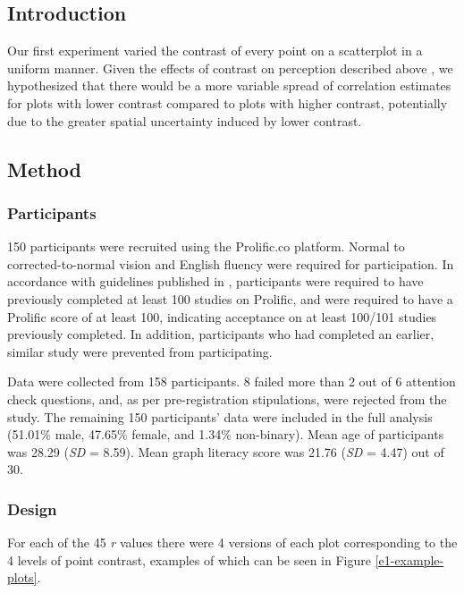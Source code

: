 \documentclass[preprint, 3p,
authoryear]{elsarticle} %
\begin{document}
\hypertarget{introduction-1}{%
\subsection{Introduction}\label{introduction-1}}

Our first experiment varied the contrast of every point on a scatterplot
in a uniform manner. Given the effects of contrast on perception
described above \citep{champion_2017, wehrhahn_1990}, we hypothesized
that there would be a more variable spread of correlation estimates for
plots with lower contrast compared to plots with higher contrast,
potentially due to the greater spatial uncertainty induced by lower
contrast.

\hypertarget{method}{%
\subsection{Method}\label{method}}

\hypertarget{participants}{%
\subsubsection{Participants}\label{participants}}

150 participants were recruited using the Prolific.co platform. Normal
to corrected-to-normal vision and English fluency were required for
participation. In accordance with guidelines published in
\citet{peer_2021}, participants were required to have previously
completed at least 100 studies on Prolific, and were required to have a
Prolific score of at least 100, indicating acceptance on at least
100/101 studies previously completed. In addition, participants who had
completed an earlier, similar study were prevented from participating.

Data were collected from 158 participants. 8 failed more than 2 out of 6
attention check questions, and, as per pre-registration stipulations,
were rejected from the study. The remaining 150 participants' data were
included in the full analysis (51.01\% male, 47.65\% female, and 1.34\%
non-binary). Mean age of participants was 28.29 (\emph{SD} = 8.59). Mean
graph literacy score was 21.76 (\emph{SD} = 4.47) out of 30.

\hypertarget{design}{%
\subsubsection{Design}\label{design}}

For each of the 45 \emph{r} values there were 4 versions of each plot
corresponding to the 4 levels of point contrast, examples of which can
be seen in Figure \ref{e1-example-plots}.
\end{document}

